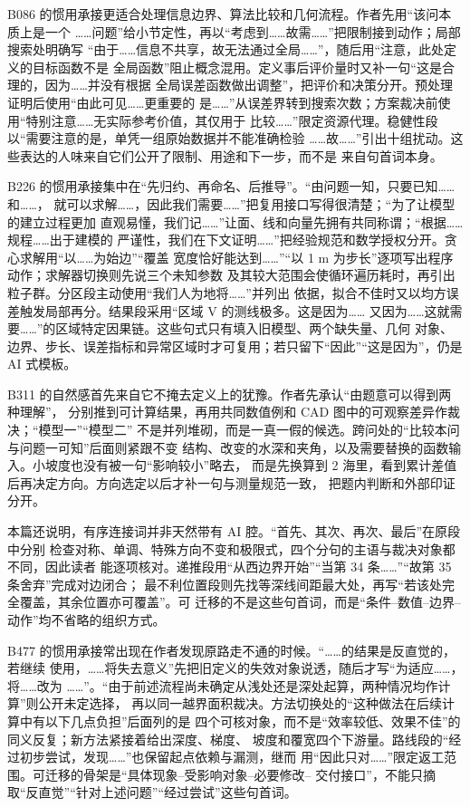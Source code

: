 B086 的惯用承接更适合处理信息边界、算法比较和几何流程。作者先用“该问本质上是一个
……问题”给小节定性，再以“考虑到……故需……”把限制接到动作；局部搜索处明确写
“由于……信息不共享，故无法通过全局……”，随后用“注意，此处定义的目标函数不是
全局函数”阻止概念混用。定义事后评价量时又补一句“这是合理的，因为……并没有根据
全局误差函数做出调整”，把评价和决策分开。预处理证明后使用“由此可见……更重要的
是……”从误差界转到搜索次数；方案裁决前使用“特别注意……无实际参考价值，其仅用于
比较……”限定资源代理。稳健性段以“需要注意的是，单凭一组原始数据并不能准确检验
……故……”引出十组扰动。这些表达的人味来自它们公开了限制、用途和下一步，而不是
来自句首词本身。

B226 的惯用承接集中在“先归约、再命名、后推导”。“由问题一知，只要已知……和……，
就可以求解……，因此我们需要……”把复用接口写得很清楚；“为了让模型的建立过程更加
直观易懂，我们记……”让面、线和向量先拥有共同称谓；“根据……规程……出于建模的
严谨性，我们在下文证明……”把经验规范和数学授权分开。贪心求解用“以……为始边”“覆盖
宽度恰好能达到……”“以 1 m 为步长”逐项写出程序动作；求解器切换则先说三个未知参数
及其较大范围会使循环遍历耗时，再引出粒子群。分区段主动使用“我们人为地将……”并列出
依据，拟合不佳时又以均方误差触发局部再分。结果段采用“区域 V 的测线极多。这是因为……
又因为……这就需要……”的区域特定因果链。这些句式只有填入旧模型、两个缺失量、几何
对象、边界、步长、误差指标和异常区域时才可复用；若只留下“因此”“这是因为”，仍是 AI
式模板。

B311 的自然感首先来自它不掩去定义上的犹豫。作者先承认“由题意可以得到两种理解”，
分别推到可计算结果，再用共同数值例和 CAD 图中的可观察差异作裁决；“模型一”“模型二”
不是并列堆砌，而是一真一假的候选。跨问处的“比较本问与问题一可知”后面则紧跟不变
结构、改变的水深和夹角，以及需要替换的函数输入。小坡度也没有被一句“影响较小”略去，
而是先换算到 2 海里，看到累计差值后再决定方向。方向选定以后才补一句与测量规范一致，
把题内判断和外部印证分开。

本篇还说明，有序连接词并非天然带有 AI 腔。“首先、其次、再次、最后”在原段中分别
检查对称、单调、特殊方向不变和极限式，四个分句的主语与裁决对象都不同，因此读者
能逐项核对。递推段用“从西边界开始”“当第 34 条……”“故第 35 条舍弃”完成对边闭合；
最不利位置段则先找等深线间距最大处，再写“若该处完全覆盖，其余位置亦可覆盖”。可
迁移的不是这些句首词，而是“条件--数值--边界--动作”均不省略的组织方式。

B477 的惯用承接常出现在作者发现原路走不通的时候。“……的结果是反直觉的，若继续
使用，……将失去意义”先把旧定义的失效对象说透，随后才写“为适应……，将……改为
……”。“由于前述流程尚未确定从浅处还是深处起算，两种情况均作计算”则公开未定选择，
再以同一越界面积裁决。方法切换处的“这种做法在后续计算中有以下几点负担”后面列的是
四个可核对象，而不是“效率较低、效果不佳”的同义反复；新方法紧接着给出深度、梯度、
坡度和覆宽四个下游量。路线段的“经过初步尝试，发现……”也保留起点依赖与漏测，继而
用“因此只对……”限定返工范围。可迁移的骨架是“具体现象--受影响对象--必要修改--
交付接口”，不能只摘取“反直觉”“针对上述问题”“经过尝试”这些句首词。


